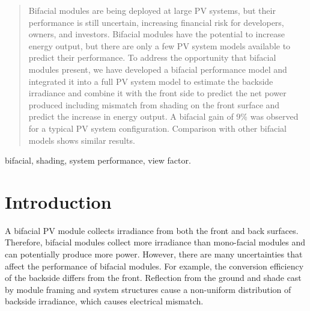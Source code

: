 \documentclass[conference]{IEEEtran}
\begin{document}
\begin{abstract}
Bifacial modules are being deployed at large PV systems, but their performance is still uncertain, increasing financial risk for developers, owners, and investors.  Bifacial modules have the potential to increase energy output, but there are only a few PV system models available to predict their performance.  To address the opportunity that bifacial modules present, we have developed a bifacial performance model and integrated it into a full PV system model to estimate the backside irradiance and combine it with the front side to predict the net power produced including mismatch from shading on the front surface and predict the increase in energy output.  A bifacial gain of 9\% was observed for a typical PV system configuration.  Comparison with other bifacial models shows similar results.
\end{abstract}
\begin{IEEEkeywords}
bifacial, shading, system performance, view factor.
\end{IEEEkeywords}




%
\IEEEpeerreviewmaketitle



\section{Introduction}
A bifacial PV module collects irradiance from both the front and back surfaces.  Therefore, bifacial modules collect more irradiance than mono-facial modules and can potentially produce more power.  However, there are many uncertainties that affect the performance of bifacial modules.  For example, the conversion efficiency of the backside differs from the front.  Reflection from the ground and shade cast by module framing and system structures cause a non-uniform distribution of backside irradiance, which causes electrical mismatch.
\end{document}
